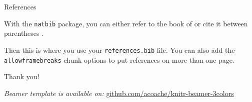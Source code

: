 \documentclass{beamer}
\begin{document}
\begin{frame}{References}

With the \texttt{natbib} package, you can either refer to the book of \citet{casella2002statistical} or cite it between parentheses \citep{rosenthal2006struck}. 

\vspace*{0.5cm}

Then this is where you use your \texttt{references.bib} file. You can also add the \texttt{allowframebreaks} chunk options to put references on more than one page. \\

\vspace*{0.5cm}

\footnotesize{
	
	
}


\end{frame}


{

\begin{frame}[plain]

\begin{center}
\textcolor{mblue}{\Large{Thank you!}}
\end{center}

\vspace*{0.25cm}

\begin{center}
	\textcolor{mblue}{\textit{Beamer template is available on:}} \href{https://github.com/acoache/knitr-beamer-3colors}{github.com/acoache/knitr-beamer-3colors}
\end{center}


\end{frame}
}
\end{document}
